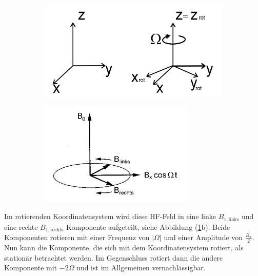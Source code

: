 \begin{figure}[hbtp]
\caption{Rotierendes Koordinatensystem.}
\centering
	\begin{subfigure}[t]{0.35\textwidth}
	\includegraphics[width=\textwidth]{Plots/rotKoordinatensystem.png}
	\end{subfigure}
	\qquad
	\qquad
	\begin{subfigure}[t]{0.35\textwidth}
	\includegraphics[width=0.8\textwidth]{Plots/B1Felder.png}
	\end{subfigure}
\label{rotKoordi}
\end{figure}
Im rotierenden Koordinatensystem wird diese HF-Feld in eine linke $B_{1,\text{links}}$ und eine rechte $B_{1,\text{rechts}}$ Komponente aufgeteilt, siehe Abbildung (\ref{rotKoordi}b).
Beide Komponenten rotieren mit einer Frequenz von $|\Omega|$ und einer Amplitude von $\frac{B_x}{2}$.
Nun kann die Komponente, die sich mit dem Koordinatensystem rotiert, als station\"{a}r betrachtet werden.
Im Gegenschluss rotiert dann die andere Komponente mit $-2\Omega$ und ist im Allgemeinen vernachl\"{a}ssigbar.

